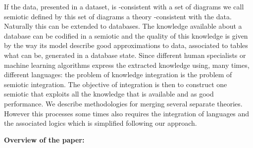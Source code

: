 \documentclass[oribibl]{llncs}
\begin{document}
If the data, presented in a dataset, is -consistent with a set of diagrams we call  semiotic defined by this set of diagrams a theory -consistent with the data. Naturally this can be extended to databases. The knowledge available about a database can be codified in a semiotic and the quality of this knowledge is given by the way its model describe good approximations to data, associated to tables what can be, generated in a database state. Since different human specialists or machine learning algorithms express the extracted knowledge using, many times, different languages: the problem of knowledge integration is the problem of semiotic integration. The objective of integration is then to construct one semiotic that exploits all the knowledge that is available and as good performance. We describe methodologies for merging several separate theories. However this processes some times also requires the integration of languages and the associated logics which is simplified following our approach.



\textbf{Overview of the paper:}
\end{document}
